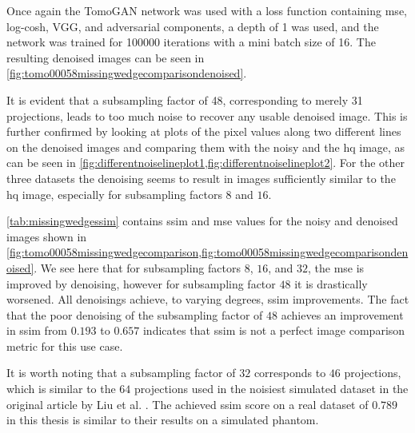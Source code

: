 Once again the TomoGAN network was used with a loss function containing \acrshort{mse}, log-cosh, VGG, and adversarial components, a depth of 1 was used, and the network was trained for 100000 iterations with a mini batch size of 16. The resulting denoised images can be seen in \cref{fig:tomo00058missingwedgecomparisondenoised}. 

It is evident that a subsampling factor of 48, corresponding to merely 31 projections, leads to too much noise to recover any usable denoised image. This is further confirmed by looking at plots of the pixel values along two different lines on the denoised images and comparing them with the noisy and the \acrshort{hq} image, as can be seen in \cref{fig:differentnoiselineplot1,fig:differentnoiselineplot2}. For the other three datasets the denoising seems to result in images sufficiently similar to the \acrshort{hq} image, especially for subsampling factors $8$ and $16$. 

\cref{tab:missingwedgessim} contains \acrshort{ssim} and \acrshort{mse} values for the noisy and denoised images shown in \cref{fig:tomo00058missingwedgecomparison,fig:tomo00058missingwedgecomparisondenoised}. We see here that for subsampling factors $8$, $16$, and $32$, the \acrshort{mse} is improved by denoising, however for subsampling factor $48$ it is drastically worsened. All denoisings achieve, to varying degrees, \acrshort{ssim} improvements. The fact that the poor denoising of the subsampling factor of $48$ achieves an improvement in \acrshort{ssim} from $0.193$ to $0.657$ indicates that \acrshort{ssim} is not a perfect image comparison metric for this use case. 

It is worth noting that a subsampling factor of $32$ corresponds to $46$ projections, which is similar to the $64$ projections used in the noisiest simulated dataset in the original article by Liu et al. \cite{liu2020tomogan}. The achieved \acrshort{ssim} score on a real dataset of $0.789$ in this thesis is similar to their results on a simulated phantom. 


